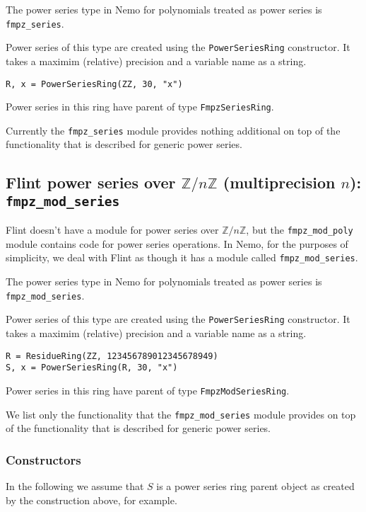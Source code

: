 \documentclass[a4paper,10pt]{article}
\newcommand{\Z}{\mathbb{Z}}
\newcommand{\code}{\lstinline}
\begin{document}
{{The power series type in Nemo for polynomials treated as power series is
\code{fmpz_series}. 

Power series of this type are created using the \code{PowerSeriesRing} constructor.
It takes a maximim (relative) precision and a variable name as a string.

\begin{lstlisting}
R, x = PowerSeriesRing(ZZ, 30, "x")
\end{lstlisting}

Power series in this ring have parent of type \code{FmpzSeriesRing}.

Currently the \code{fmpz_series} module provides nothing additional on top of
the functionality that is described for generic power series.

\subsection{Flint power series over $\Z/n\Z$ (multiprecision $n$): \code{fmpz_mod_series}}

Flint doesn't have a module for power series over $\Z/n\Z$, but the \code{fmpz_mod_poly}
module contains code for power series operations. In Nemo, for the purposes of
simplicity, we deal with Flint as though it has a module called \code{fmpz_mod_series}.

The power series type in Nemo for polynomials treated as power series is
\code{fmpz_mod_series}. 

Power series of this type are created using the \code{PowerSeriesRing} constructor.
It takes a maximim (relative) precision and a variable name as a string.

\begin{lstlisting}
R = ResidueRing(ZZ, 123456789012345678949)
S, x = PowerSeriesRing(R, 30, "x")
\end{lstlisting}

Power series in this ring have parent of type \code{FmpzModSeriesRing}.

We list only the functionality that the \code{fmpz_mod_series} module provides on top of
the functionality that is described for generic power series.

\subsubsection{Constructors}

In the following we assume that $S$ is a power series ring parent object as created
by the construction above, for example.

}}
\end{document}
